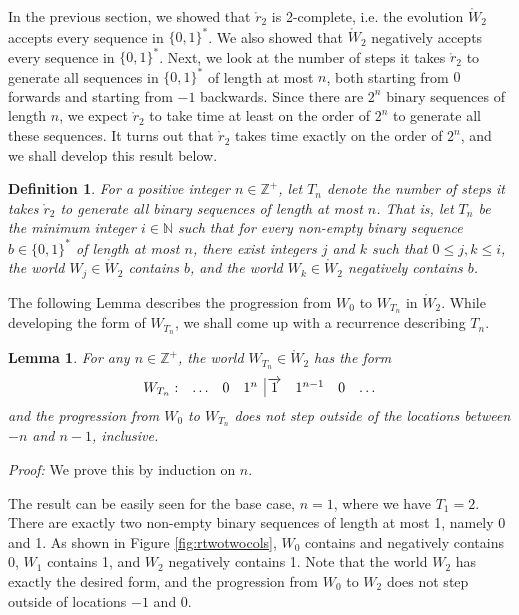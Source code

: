 \documentclass[12pt]{amsart}
\newtheorem{definition}[theorem]{Definition}
\newtheorem{lemma}[theorem]{Lemma}
\newcommand{\binseq}{\{0,1\}^*}
\newcommand{\raa}[1]{\hspace{-0.11cm}\overrightarrow{#1}}
\newcommand{\rtwo}{\mathring{r}_2}
\newcommand{\wtwo}{\mathring{W}_2}
\newcommand{\znn}{\mathbb{N}}
\newcommand{\zp}{\mathbb{Z}^+}
\begin{document}
In the previous section, we showed that $\rtwo$ is 2-complete, i.e. the evolution $\wtwo$ accepts every sequence in $\binseq$. We also showed that $\wtwo$ negatively accepts every sequence in $\binseq$. Next, we look at the number of steps it takes $\rtwo$ to generate all sequences in $\binseq$ of length at most $n$, both starting from $0$ forwards and starting from $-1$ backwards. Since there are $2^n$ binary sequences of length $n$, we expect $\rtwo$ to take time at least on the order of $2^n$ to generate all these sequences. It turns out that $\rtwo$ takes time exactly on the order of $2^n$, and we shall develop this result below.

\begin{definition}
For a positive integer $n \in \zp$, let $T_n$ denote the number of steps it takes $\rtwo$ to generate all binary sequences of length at most $n$. That is, let $T_n$ be the minimum integer $i \in \znn$ such that for every non-empty binary sequence $b \in \binseq$ of length at most $n$, there exist integers $j$ and $k$ such that $0 \leq j,k \leq i$, the world $W_j \in \wtwo$ contains $b$, and the world $W_k \in \wtwo$ negatively contains $b$.
\end{definition}

The following Lemma describes the progression from $W_0$ to $W_{T_n}$ in $\wtwo$. While developing the form of $W_{T_n}$, we shall come up with a recurrence describing $T_n$.

\begin{lemma}
For any $n \in \zp$, the world $W_{T_n} \in \wtwo$ has the form
$$\begin{array}{cccc|cccc}
W_{T_n}: & \ldots & 0 & 1^{n} & \raa{1} & 1^{n-1} & 0 & \ldots
\end{array}$$
and the progression from $W_0$ to $W_{T_n}$ does not step outside of the locations between $-n$ and $n-1$, inclusive.
\label{lemma:T_n_form}
\end{lemma}

\textit{Proof:} We prove this by induction on $n$.

The result can be easily seen for the base case, $n = 1$, where we have $T_1 = 2$. There are exactly two non-empty binary sequences of length at most 1, namely 0 and 1. As shown in Figure \ref{fig:rtwotwocols}, $W_0$ contains and negatively contains 0, $W_1$ contains 1, and $W_2$ negatively contains 1. Note that the world $W_2$ has exactly the desired form, and the progression from $W_0$ to $W_2$ does not step outside of locations $-1$ and $0$.
\end{document}
